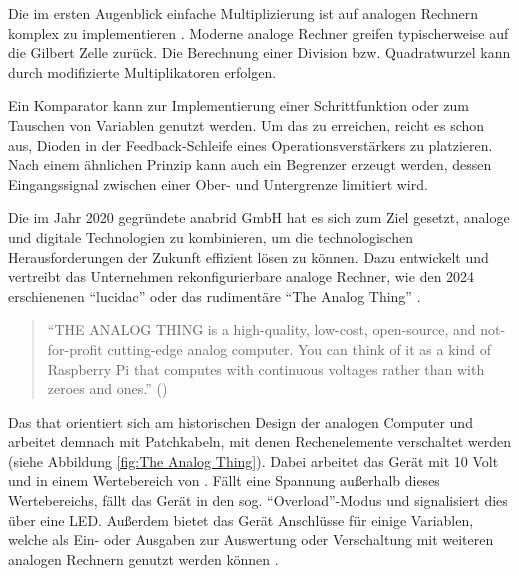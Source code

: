 Die im ersten Augenblick einfache Multiplizierung ist auf analogen Rechnern komplex zu implementieren \cite[vgl. S. 105]{Ulmann2022}. Moderne analoge Rechner greifen typischerweise auf die Gilbert Zelle zurück. Die Berechnung einer Division bzw. Quadratwurzel kann durch modifizierte Multiplikatoren erfolgen. \cite[S. 114 f.]{Ulmann2022}

Ein Komparator kann \zb zur Implementierung einer Schrittfunktion oder zum Tauschen von Variablen genutzt werden. Um das zu erreichen, reicht es schon aus, Dioden in der Feedback-Schleife eines Operationsverstärkers zu platzieren. Nach einem ähnlichen Prinzip kann auch ein Begrenzer erzeugt werden, dessen Eingangssignal zwischen einer Ober- und Untergrenze limitiert wird. \cite[S. 116]{Ulmann2022}

Die im Jahr 2020 gegründete anabrid GmbH hat es sich zum Ziel gesetzt, analoge und digitale Technologien zu kombinieren, um die technologischen Herausforderungen der Zukunft effizient lösen zu können. Dazu entwickelt und vertreibt das Unternehmen rekonfigurierbare analoge Rechner, wie den 2024 erschienenen "`lucidac"' oder das rudimentäre "`The Analog Thing"' \cite{AnabridWebsite}.

\begin{quote}
  "`THE ANALOG THING is a high-quality, low-cost, open-source, and not-for-profit cutting-edge analog computer. You can think of it as a kind of Raspberry Pi that computes with continuous voltages rather than with zeroes and ones."' (\cite{TheAnalogThingDocs})
\end{quote}

Das \ac{that} orientiert sich am historischen Design der analogen Computer und arbeitet demnach mit Patchkabeln, mit denen Rechenelemente verschaltet werden (siehe Abbildung \ref{fig:The Analog Thing}). Dabei arbeitet das Gerät mit 10 Volt und in einem Wertebereich von . Fällt eine Spannung außerhalb dieses Wertebereichs, fällt das Gerät in den sog. "`Overload"'-Modus und signalisiert dies über eine LED. Außerdem bietet das Gerät Anschlüsse für einige Variablen, welche als Ein- oder Ausgaben zur Auswertung oder Verschaltung mit weiteren analogen Rechnern genutzt werden können \cite{TheAnalogThingDocs}.

